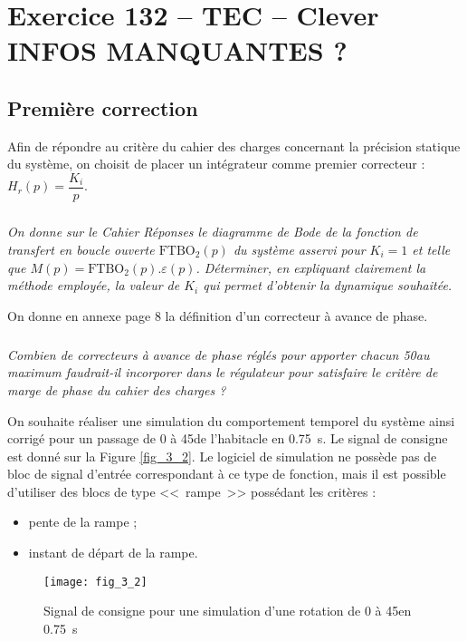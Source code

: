 \section*{Exercice 132 -- TEC -- Clever INFOS MANQUANTES  ?}
\setcounter{exo}{0}


\subsection*{Première correction}
Afin de répondre au critère du cahier des charges concernant la précision statique du système, on choisit de placer un intégrateur comme premier correcteur : $H_r(p)=\dfrac{K_i}{p}$.

\subparagraph{}
\textit{On donne sur le Cahier Réponses le diagramme de Bode de la fonction de transfert en boucle ouverte $ \text{FTBO}_2(p)$ du système asservi pour $K_i = 1$ et telle que $M(p) = \text{FTBO}_2(p).\varepsilon(p)$. Déterminer, en expliquant clairement la méthode employée, la valeur de $K_i$ qui permet d'obtenir la dynamique souhaitée.}
\ifprof
\begin{corrige}
\end{corrige}
\else
\fi

On donne en annexe page 8 la définition d'un correcteur à avance de phase.
\subparagraph{}
\textit{Combien de correcteurs à avance de phase réglés pour apporter chacun 50\degres au maximum faudrait-il incorporer dans le régulateur pour satisfaire le critère de marge de phase du cahier des charges ?}
\ifprof
\begin{corrige}
\end{corrige}
\else
\fi



On souhaite réaliser une simulation du comportement temporel du système ainsi corrigé pour un passage de 0 à 45\degres de l'habitacle en \SI{0,75}{s}. Le signal de consigne est donné sur la Figure \autoref{fig_3_2}. Le logiciel de simulation ne possède pas de bloc de signal d'entrée correspondant à ce type de fonction, mais il est possible d'utiliser des blocs de type  <<~rampe~>> possédant les critères :
\begin{itemize}
\item pente de la rampe ;
\item instant de départ de la rampe.
\end{itemize}


\begin{figure}[H]
\centering
\texttt{[image: fig\_3\_2]}
\caption{ Signal de consigne pour une simulation d'une rotation de 0 à 45\degres en \SI{0,75}{s}}
\label{fig_3_2}
\end{figure}


